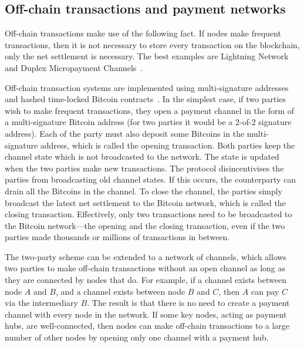 
\subsection{Off-chain transactions and payment networks}
Off-chain transactions make use of the following fact.
If nodes make frequent transactions,
then it is not necessary to store every transaction on the blockchain,
only the net settlement is necessary.
The best examples are Lightning Network~\cite{lightningnetwork} and Duplex Micropayment Channels~\cite{decker2015fast}.

Off-chain transaction systems are implemented using multi-signature addresses~\cite{bitcoinmultisig} and hashed time-locked Bitcoin contracts~\cite{bitcointimelock}.
In the simplest case, 
if two parties wish to make frequent transactions,
they open a payment channel in the form of a multi-signature Bitcoin address (for two parties it would be a 2-of-2 signature address).
Each of the party must also deposit some Bitcoins in the multi-signature address,
which is called the opening transaction.
Both parties keep the channel state which is not broadcasted to the network.
The state is updated when the two parties make new transactions.
The protocol disincentivises the parties from broadcasting old channel states.
If this occurs, the counterparty can drain all the Bitcoins in the channel.
To close the channel, the parties simply broadcast the latest net settlement to the Bitcoin network,
which is called the closing transaction.
Effectively, only two transactions need to be broadcasted to the Bitcoin network---the opening and the closing transaction,
even if the two parties made thousands or millions of transactions in between.

The two-party scheme can be extended to a network of channels,
which allows two parties to make off-chain transactions without an open channel as long as they are connected by nodes that do.
For example, if a channel exists between node $A$ and $B$, and a channel exists between node $B$ and $C$,
then $A$ can pay $C$ via the intermediary $B$.
The result is that there is no need to create a payment channel with every node in the network.
If some key nodes, acting as payment hubs, are well-connected,
then nodes can make off-chain transactions to a large number of other nodes by opening only one channel with a payment hub.

